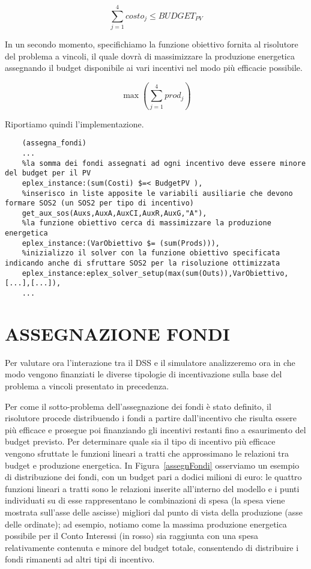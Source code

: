 \documentclass[12pt,a4paper,openright,twoside]{report}
\begin{document}
\begin{equation} \label{eq:vincoloCosti}
	\sum_{j=1}^4 costo_j \leq BUDGET_{PV}
\end{equation}

In un secondo momento, specifichiamo la funzione obiettivo fornita al risolutore del problema a vincoli, il quale dovrà di massimizzare la produzione energetica assegnando il budget disponibile ai vari incentivi nel modo più efficacie possibile.

\begin{equation} \label{eq:vincoloCosti}
	\max ( \sum_{j=1}^4 prod_j )
\end{equation}

Riportiamo quindi l'implementazione.

\begin{lstlisting}
	(assegna_fondi)
	...
	%la somma dei fondi assegnati ad ogni incentivo deve essere minore del budget per il PV
	eplex_instance:(sum(Costi) $=< BudgetPV ),
	%inserisco in liste apposite le variabili ausiliarie che devono formare SOS2 (un SOS2 per tipo di incentivo)
	get_aux_sos(Auxs,AuxA,AuxCI,AuxR,AuxG,"A"),
	%la funzione obiettivo cerca di massimizzare la produzione energetica
	eplex_instance:(VarObiettivo $= (sum(Prods))),
	%inizializzo il solver con la funzione obiettivo specificata indicando anche di sfruttare SOS2 per la risoluzione ottimizzata 
	eplex_instance:eplex_solver_setup(max(sum(Outs)),VarObiettivo,[...],[...]),
	...
\end{lstlisting}

\section{ASSEGNAZIONE FONDI}

Per valutare ora l'interazione tra il DSS e il simulatore analizzeremo ora in che modo vengono finanziati le diverse tipologie di incentivazione sulla base del problema a vincoli presentato in precedenza.

Per come il sotto-problema dell'assegnazione dei fondi è stato definito, il risolutore procede distribuendo i fondi a partire dall'incentivo che risulta essere più efficace e prosegue poi finanziando gli incentivi restanti fino a esaurimento del budget previsto. Per determinare quale sia il tipo di incentivo più efficace vengono sfruttate le funzioni lineari a tratti che approssimano le relazioni tra budget e produzione energetica. In Figura~\ref{assegnFondi} osserviamo un esempio di distribuzione dei fondi, con un budget pari a dodici milioni di euro: le quattro funzioni lineari a tratti sono le relazioni inserite all'interno del modello e i punti individuati su di esse rappresentano le combinazioni di spesa (la spesa viene mostrata sull'asse delle ascisse) migliori dal punto di vista della produzione (asse delle ordinate); ad esempio, notiamo come la massima produzione energetica possibile per il Conto Interessi (in rosso) sia raggiunta con una spesa relativamente contenuta e minore del budget totale, consentendo di distribuire i fondi rimanenti ad altri tipi di incentivo.
\end{document}
